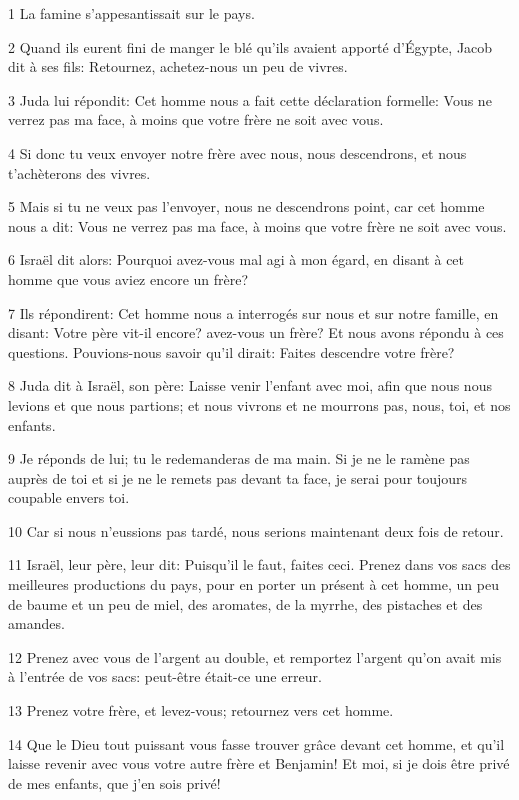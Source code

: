 \par 1 La famine s'appesantissait sur le pays.
\par 2 Quand ils eurent fini de manger le blé qu'ils avaient apporté d'Égypte, Jacob dit à ses fils: Retournez, achetez-nous un peu de vivres.
\par 3 Juda lui répondit: Cet homme nous a fait cette déclaration formelle: Vous ne verrez pas ma face, à moins que votre frère ne soit avec vous.
\par 4 Si donc tu veux envoyer notre frère avec nous, nous descendrons, et nous t'achèterons des vivres.
\par 5 Mais si tu ne veux pas l'envoyer, nous ne descendrons point, car cet homme nous a dit: Vous ne verrez pas ma face, à moins que votre frère ne soit avec vous.
\par 6 Israël dit alors: Pourquoi avez-vous mal agi à mon égard, en disant à cet homme que vous aviez encore un frère?
\par 7 Ils répondirent: Cet homme nous a interrogés sur nous et sur notre famille, en disant: Votre père vit-il encore? avez-vous un frère? Et nous avons répondu à ces questions. Pouvions-nous savoir qu'il dirait: Faites descendre votre frère?
\par 8 Juda dit à Israël, son père: Laisse venir l'enfant avec moi, afin que nous nous levions et que nous partions; et nous vivrons et ne mourrons pas, nous, toi, et nos enfants.
\par 9 Je réponds de lui; tu le redemanderas de ma main. Si je ne le ramène pas auprès de toi et si je ne le remets pas devant ta face, je serai pour toujours coupable envers toi.
\par 10 Car si nous n'eussions pas tardé, nous serions maintenant deux fois de retour.
\par 11 Israël, leur père, leur dit: Puisqu'il le faut, faites ceci. Prenez dans vos sacs des meilleures productions du pays, pour en porter un présent à cet homme, un peu de baume et un peu de miel, des aromates, de la myrrhe, des pistaches et des amandes.
\par 12 Prenez avec vous de l'argent au double, et remportez l'argent qu'on avait mis à l'entrée de vos sacs: peut-être était-ce une erreur.
\par 13 Prenez votre frère, et levez-vous; retournez vers cet homme.
\par 14 Que le Dieu tout puissant vous fasse trouver grâce devant cet homme, et qu'il laisse revenir avec vous votre autre frère et Benjamin! Et moi, si je dois être privé de mes enfants, que j'en sois privé!
